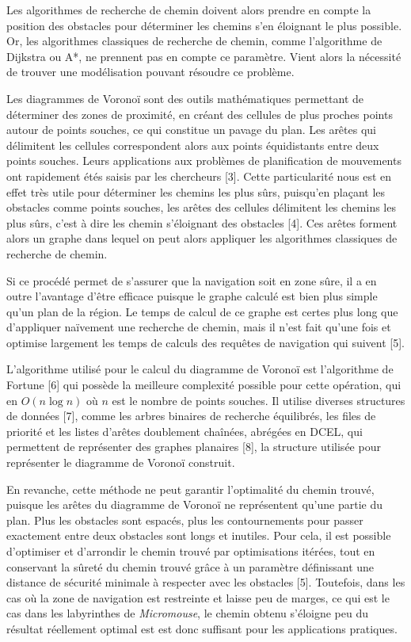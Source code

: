 \documentclass[a4paper]{article}
\begin{document}
Les algorithmes de recherche de chemin doivent alors prendre en compte la position des obstacles pour déterminer les chemins s'en éloignant le plus possible.
Or, les algorithmes classiques de recherche de chemin, comme l'algorithme de Dijkstra ou A*, ne prennent pas en compte ce paramètre.
Vient alors la nécessité de trouver une modélisation pouvant résoudre ce problème.

Les diagrammes de Voronoï sont des outils mathématiques permettant de déterminer des zones de proximité, en créant des cellules de plus proches points autour de points souches, ce qui constitue un pavage du plan.
Les arêtes qui délimitent les cellules correspondent alors aux points équidistants entre deux points souches.
Leurs applications aux problèmes de planification de mouvements ont rapidement étés saisis par les chercheurs [3].
Cette particularité nous est en effet très utile pour déterminer les chemins les plus sûrs, puisqu'en plaçant les obstacles comme points souches, les arêtes des cellules délimitent les chemins les plus sûrs, c'est à dire les chemin s'éloignant des obstacles [4].
Ces arêtes forment alors un graphe dans lequel on peut alors appliquer les algorithmes classiques de recherche de chemin.

Si ce procédé permet de s'assurer que la navigation soit en zone sûre, il a en outre l'avantage d'être efficace puisque le graphe calculé est bien plus simple qu'un plan de la région.
Le temps de calcul de ce graphe est certes plus long que d'appliquer naïvement une recherche de chemin, mais il n'est fait qu'une fois et optimise largement les temps de calculs des requêtes de navigation qui suivent [5].

L'algorithme utilisé pour le calcul du diagramme de Voronoï est l'algorithme de Fortune [6] qui possède la meilleure complexité possible pour cette opération, qui en \(O(n\log n)\) où \(n\) est le nombre de points souches.
Il utilise diverses structures de données [7], comme les arbres binaires de recherche équilibrés, les files de priorité et les listes d'arêtes doublement chaînées, abrégées en DCEL, qui permettent de représenter des graphes planaires [8], la structure utilisée pour représenter le diagramme de Voronoï construit.

En revanche, cette méthode ne peut garantir l'optimalité du chemin trouvé, puisque les arêtes du diagramme de Voronoï ne représentent qu'une partie du plan. Plus les obstacles sont espacés, plus les contournements pour passer exactement entre deux obstacles sont longs et inutiles.
Pour cela, il est possible d'optimiser et d'arrondir le chemin trouvé par optimisations itérées, tout en conservant la sûreté du chemin trouvé grâce à un paramètre définissant une distance de sécurité minimale à respecter avec les obstacles [5].
Toutefois, dans les cas où la zone de navigation est restreinte et laisse peu de marges, ce qui est le cas dans les labyrinthes de \textit{Micromouse}, le chemin obtenu s'éloigne peu du résultat réellement optimal est est donc suffisant pour les applications pratiques.
\end{document}
